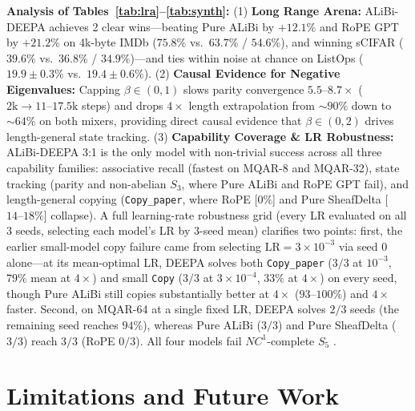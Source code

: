 \documentclass[10pt,a4paper]{article}
\begin{document}
\noindent\textbf{Analysis of Tables~\ref{tab:lra}--\ref{tab:synth}:}
(1) \textbf{Long Range Arena:} ALiBi-DEEPA achieves 2 clear wins---beating Pure ALiBi by $+12.1\%$ and RoPE GPT by $+21.2\%$ on 4k-byte IMDb ($75.8\%$ vs.\ $63.7\%$ / $54.6\%$), and winning sCIFAR ($39.6\%$ vs.\ $36.8\%$ / $34.9\%$)---and ties within noise at chance on ListOps ($19.9 \pm 0.3\%$ vs.\ $19.4 \pm 0.6\%$).
(2) \textbf{Causal Evidence for Negative Eigenvalues:} Capping $\beta \in (0,1)$ slows parity convergence $5.5\text{--}8.7\times$ ($2\text{k}\to 11\text{--}17.5\text{k}$ steps) and drops $4\times$ length extrapolation from $\sim 90\%$ down to $\sim 64\%$ on both mixers, providing direct causal evidence that $\beta \in (0,2)$ drives length-general state tracking.
(3) \textbf{Capability Coverage \& LR Robustness:} ALiBi-DEEPA 3:1 is the only model with non-trivial success across all three capability families: associative recall (fastest on MQAR-8 and MQAR-32), state tracking (parity and non-abelian $S_3$, where Pure ALiBi and RoPE GPT fail), and length-general copying (\texttt{Copy\_paper}, where RoPE [$0\%$] and Pure SheafDelta [$14\text{--}18\%$] collapse). A full learning-rate robustness grid (every LR evaluated on all 3 seeds, selecting each model's LR by 3-seed mean) clarifies two points: first, the earlier small-model copy failure came from selecting $\text{LR}=3\times 10^{-3}$ via seed 0 alone---at its mean-optimal LR, DEEPA solves both \texttt{Copy\_paper} ($3/3$ at $10^{-3}$, $79\%$ mean at $4\times$) and small \texttt{Copy} ($3/3$ at $3\times 10^{-4}$, $33\%$ at $4\times$) on every seed, though Pure ALiBi still copies substantially better at $4\times$ ($93\text{--}100\%$) and $4\times$ faster. Second, on MQAR-64 at a single fixed LR, DEEPA solves $2/3$ seeds (the remaining seed reaches $94\%$), whereas Pure ALiBi ($3/3$) and Pure SheafDelta ($3/3$) reach $3/3$ (RoPE $0/3$). All four models fail $NC^1$-complete $S_5$ \cite{merrill2024}.

\section{Limitations and Future Work}
\end{document}
